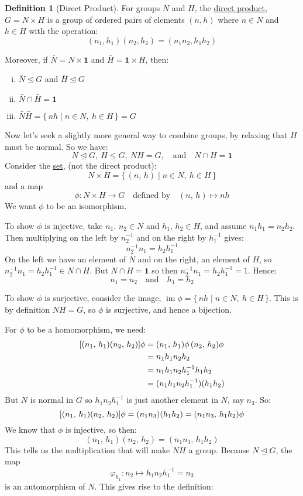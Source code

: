 \documentclass[a4paper, oneside, 12pt, final]{article}
\renewcommand{\emph}{\underline}
\theoremstyle{definition}
\newtheorem{definition}[theorem]{Definition}
\DeclareMathOperator{\im}{im}
\newcommand{\nrmsgp}{\unlhd}
\begin{document}
\begin{definition}[Direct Product]
    For groups \(N\) and \(H\), the \emph{direct product}, \(G = N\times H\) is a group of ordered pairs of elements
    \((n, h)\) where \(n \in N\) and \(h \in H\) with the operation:
    \[(n_1, h_1)(n_2, h_2) = (n_1n_2, h_1h_2)\]

    Moreover, if \(\bar{N} = N \times \bm{1}\) and \(\bar{H} = \bm{1} \times H\), then:
    \begin{enumerate}[(i)]
        \item \(\bar{N} \nrmsgp G\) and \(\bar{H} \nrmsgp G\)
        \item \(\bar{N} \cap \bar{H} = \bm{1}\)
        \item \(\bar{N}\bar{H} = \{\,nh \mid n \in N,\ h \in H\,\} = G\)
    \end{enumerate}
\end{definition}

Now let's seek a slightly more general way to combine groups, by relaxing that \(H\) must be normal.
So we have:
\[N \nrmsgp G,\ H \leqslant G,\ NH = G, \quad \text{and} \quad N \cap H = \bm{1}\]
Consider the \emph{set}, (not the direct product):
\[N \times H = \{\,(n,\,h) \mid n \in N,\ h \in H\,\}\]
and a map
\[\phi:N \times H \to G \quad \text{defined by} \quad (n,\, h) \mapsto nh\]
We want \(\phi\) to be an isomorphism.

To show \(\phi\) is injective, take \(n_1,\, n_2 \in N\) and \(h_1,\, h_2 \in H\), and assume \(n_1 h_1 = n_2 h_2\).
Then multiplying on the left by \(n_2^{-1}\) and on the right by \(h_1^{-1}\) gives:
\[n_2^{-1} n_1 = h_2 h_1^{-1}\]
On the left we have an element of \(N\) and on the right, an element of \(H\), so \(n_2^{-1} n_1 = h_2 h_1^{-1} \in N
\cap H\).
But \(N \cap H = \bm{1}\) so then \(n_2^{-1} n_1 = h_2 h_1^{-1} = 1\).
Hence:
\[n_1 = n_2 \quad \text{and} \quad h_1 = h_2\]

To show \(\phi\) is surjective, consider the image, \(\im{\phi} = \{\,nh \mid n \in N,\ h \in H\,\}\).
This is by definition \(NH = G\), so \(\phi\) is surjective, and hence a bijection.

For \(\phi\) to be a homomorphism, we need:
\begin{equation*}
\begin{aligned}
    \relax[(n_1,\,h_1)(n_2,\,h_2)]\phi &= (n_1,\,h_1)\phi\,(n_2,\,h_2)\phi \\
    &= n_1 h_1 n_2 h_2 \\
    &= n_1 h_1 n_2 h_1^{-1} h_1 h_2 \\
    &= (n_1 h_1 n_2 h_1^{-1})(h_1 h_2)
\end{aligned}
\end{equation*}
But \(N\) is normal in \(G\) so \(h_1 n_2 h_1^{-1}\) is just another element in \(N\), say \(n_3\).
So:
\[\relax[(n_1,\,h_1)(n_2,\,h_2)]\phi = (n_1 n_3)(h_1 h_2) = (n_1 n_3,\,h_1 h_2)\phi\]
We know that \(\phi\) is injective, so then:
\[(n_1,\,h_1)(n_2,\,h_2) = (n_1 n_3,\,h_1 h_2)\]
This tells us the multiplication that will make \(NH\) a group.
Because \(N \nrmsgp G\), the map
\[\varphi_{h_1}:n_2 \mapsto h_1 n_2 h_1^{-1} = n_3\]
is an automorphism of \(N\).
This gives rise to the definition:
\end{document}
